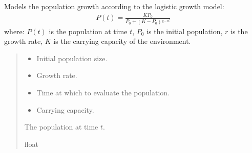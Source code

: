 \documentclass[a4paper,14pt,oneside,english,openany]{sphinxmanual}
\begin{document}
\begin{fulllineitems}
\label{\detokenize{newtest:newtest.logistic_growth}}
\pysigstartsignatures
{}
\pysigstopsignatures
\sphinxAtStartPar
Models the population growth according to the logistic growth model:
\begin{equation*}
\begin{split}P(t) = \frac{K P_0}{P_0 + (K - P_0) e^{-rt}}\end{split}
\end{equation*}
\sphinxAtStartPar
where:
\sphinxhyphen{} \(P(t)\) is the population at time \(t\),
\sphinxhyphen{} \(P_0\) is the initial population,
\sphinxhyphen{} \(r\) is the growth rate,
\sphinxhyphen{} \(K\) is the carrying capacity of the environment.
\begin{quote}\begin{description}
\begin{itemize}
\item {} 
\sphinxAtStartPar
{} \textendash{} Initial population size.

\item {} 
\sphinxAtStartPar
{} \textendash{} Growth rate.

\item {} 
\sphinxAtStartPar
{} \textendash{} Time at which to evaluate the population.

\item {} 
\sphinxAtStartPar
{} \textendash{} Carrying capacity.

\end{itemize}

\sphinxAtStartPar
The population at time \(t\).

\sphinxAtStartPar
float

\end{description}\end{quote}

\end{fulllineitems}

\end{document}
